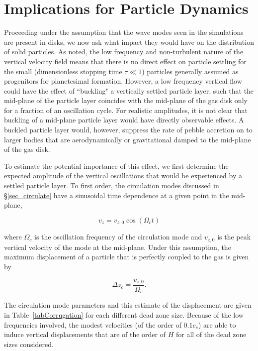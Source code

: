 \section{Implications for Particle Dynamics}
Proceeding under the assumption that the wave modes seen in the simulations are present in disks, we now ask what impact they would have on the distribution of solid particles. As \cite{oishi09} noted, the low frequency and non-turbulent nature of the vertical velocity field means that there is no direct effect on particle settling for the small 
(dimensionless stopping time $\tau \ll 1$) particles generally assumed as progenitors for planetesimal formation. However, a low frequency vertical flow could have the effect of ``buckling" a vertically settled particle layer, such that the mid-plane of the particle layer coincides with the mid-plane of the gas disk only for a fraction of an oscillation cycle. For realistic amplitudes, it is not clear that buckling of a mid-plane particle layer would have directly observable effects. A buckled particle layer would, however, suppress the rate of pebble accretion \citep{lambrechts12} on to larger bodies that are aerodynamically or gravitational damped to the mid-plane of the gas disk.

To estimate the potential importance of this effect, we first determine the expected amplitude of the vertical oscillations that would be experienced by a settled particle layer. 
To first order, the circulation modes discussed in \S\ref{sec_circulate} have a sinusoidal time dependence at a given point in the mid-plane,

\begin{equation}
v_z=v_{z,0}\cos(\Omega_c t)                
\end{equation}

\noindent where $\Omega_c$ is the oscillation frequency of the circulation mode and $v_{z,0}$ is the peak vertical velocity of the mode at the mid-plane.  Under this assumption, the maximum displacement of a particle that is perfectly coupled to the gas is given by

\begin{equation}
\Delta z_c = \frac{v_{z,0}}{\Omega_c}.                
\end{equation}

\noindent The circulation mode parameters and this estimate of the displacement are given in Table~\ref{tabCorrugation} for each different dead zone size. Because of the low frequencies involved, the modest velocities (of the order of 
$0.1 c_s$) are able to induce vertical displacements that are of the order of $H$ for all of the dead zone sizes considered.

